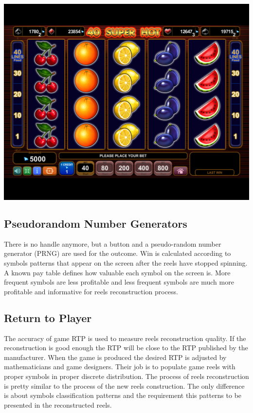\documentclass[a0,portrait,25pt]{sciposter}
\begin{document}
\begin{multicols}{3}
\begin{mdframed}[backgroundcolor=white,roundcorner=4pt,shadow=true,linewidth=1pt]
\begin{minipage}[c]{1\linewidth}
\includegraphics[width=0.9\linewidth]{pic004} \\
\end{minipage}
\end{mdframed}

\begin{mdframed}[backgroundcolor=white,roundcorner=4pt,shadow=true,linewidth=1pt]
\color{Black}
\section*{Pseudorandom Number Generators}
There is no handle anymore, but a button and a pseudo-random number generator (PRNG) are used for the outcome. Win is calculated according to symbols patterns that appear on the screen after the reels have stopped spinning. A known pay table defines how valuable each symbol on the screen is. More frequent symbols are less profitable and less frequent symbols are much more profitable and informative for reels reconstruction process. 
\end{mdframed}

\begin{mdframed}[backgroundcolor=white,roundcorner=4pt,shadow=true,linewidth=1pt]
\color{Black}
\section*{Return to Player}
The accuracy of game RTP is used to measure reels reconstruction quality. If the reconstruction is good enough the RTP will be close to the RTP published by the manufacturer. When the game is produced the desired RTP is adjusted by mathematicians and game designers. Their job is to populate game reels with proper symbols in proper discrete distribution. The process of reels reconstruction is pretty similar to the process of the new reels construction. The only difference is about symbols classification patterns and the requirement this patterns to be presented in the reconstructed reels.
\end{mdframed}


\end{multicols}
\end{document}
